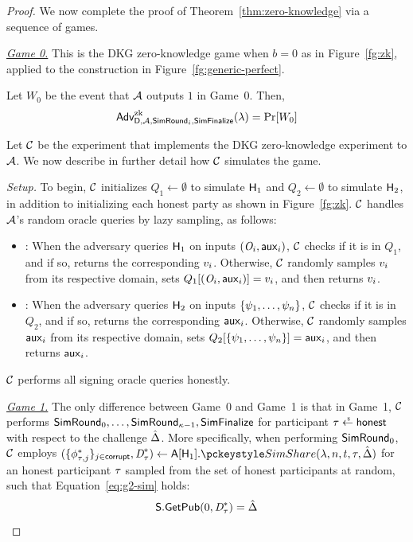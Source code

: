 \begin{proof}
  We now complete the proof of Theorem~\ref{thm:zero-knowledge} via a sequence of games.


\medskip

\noindent \textit{\underline{Game 0.}}
This is the DKG zero-knowledge game when $b=0$ as in Figure~\ref{fg:zk},
applied to the construction in Figure~\ref{fg:generic-perfect}.

Let $W_0$ be the event that $\mathcal{A}$ outputs $1$ in Game~0. Then,
\[ \textsf{\upshape Adv}^{\textrm{\upshape zk}}_{\mathsf{D},\mathcal{A},\mathsf{SimRound}_i,\mathsf{SimFinalize}}(\lambda)  = \Pr[W_0]    \]

Let $\mathcal{C}$ be the experiment that implements the DKG zero-knowledge experiment to $\mathcal{A}$.
We now describe in further detail how $\mathcal{C}$ simulates the game.

\medskip

\noindent \textit{Setup.}
To begin, $\mathcal{C}$ initializes $Q_1 \gets \emptyset$ to simulate $\mathsf{H}_1$
and $Q_2 \gets \emptyset$ to simulate $\mathsf{H}_2$,
in addition to initializing each honest party as shown in Figure~\ref{fg:zk}.
$\mathcal{C}$ handles $\mathcal{A}$'s random oracle queries by lazy sampling, as follows:

  \begin{itemize}
    \item[$\underline{\Hash_1}$]: When the adversary queries $\mathsf{H}_1$ on inputs $(\textit{O}_i, \mathsf{aux}_i)$,
      $\mathcal{C}$ checks if it is in $Q_1$, and if so, returns the corresponding $v_i$.
      Otherwise, $\mathcal{C}$ randomly samples $v_i$ from its respective domain,
      sets $Q_1[(\textit{O}_i, \mathsf{aux}_i)] = v_i$, and then returns $v_i$.
    \item[$\underline{\Hash_2}$]: When the adversary queries $\mathsf{H}_2$ on inputs $\{\psi_1,\ldots,\psi_n \}$,
      $\mathcal{C}$ checks if it is in $Q_2$, and if so, returns the corresponding $\mathsf{aux}_i$.
      Otherwise, $\mathcal{C}$ randomly samples $\mathsf{aux}_i$ from its respective domain,
      sets $Q_2[\{\psi_1,\ldots,\psi_n \}] = \mathsf{aux}_i$, and then returns $\mathsf{aux}_i$.
  \end{itemize}

$\mathcal{C}$ performs all signing oracle queries honestly.

\medskip

\noindent \textit{\underline{Game 1.}}
The only difference between Game~0 and Game~1 is that in Game~1,
$\mathcal{C}$ performs $\mathsf{SimRound}_0, \ldots, \mathsf{SimRound}_{\kappa-1},
\mathsf{SimFinalize}$ for participant $\simid \rgets \honest$ with respect to the challenge $\hat{\Delta}$.
More specifically,
when performing $\mathsf{SimRound}_0$,
$\mathcal{C}$ employs $(\{ \share_{\tau,j}^* \}_{j \in \corrupt},\allowbreak\vsscommit_\simid^*) \gets \avss[\Hash_1].\simshare(\lambda,n,t,\simid,\dkgchal)$ for an honest participant $\tau$ sampled from the set of honest participants at random,
such that Equation~\ref{eq:g2-sim} holds:
  \begin{equation} \label{eq:g2-sim}
    \mathsf{S}.\mathsf{GetPub}(0, \textit{D}_\tau^*) = \hat{\Delta}
  \end{equation}


\end{proof}
